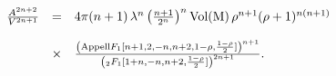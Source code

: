 \begin{equation}
\begin{array}{rcl}
\frac{A^{2n+2}}{V^{2n+1}}&=&4\pi(n+1)\,\lambda^n\left(\frac{n+1}{2^n}
 \right)^{n}\mathrm{Vol(M)}\,\rho^{n+1} (\rho+1)^{n(n+1)}\\ \\
 &\times&\frac{\left({\rm{Appell}}F_{1}[n+1,2,-n,n+2,1-\rho,\frac{1-\rho}{2}]\right)^{n+1}}{\left(_2F_{1}[1+n,-n,n+2,\frac{1-\rho}{2}]\right)^{2n+1}}.
\end{array}
\end{equation}

